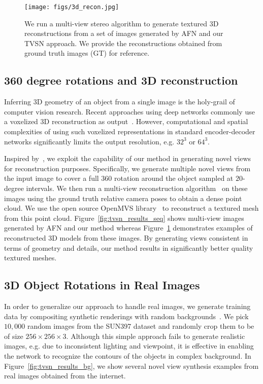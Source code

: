 \documentclass[10pt,twocolumn,letterpaper]{article}
\begin{document}
\begin{figure}[t]
\vspace{-2mm}
\begin{center}
\texttt{[image: figs/3d\_recon.jpg]}
\end{center}
\caption{We run a multi-view stereo algorithm to generate textured 3D reconstructions from a set of images generated by AFN and our TVSN approach. We provide the reconstructions obtained from ground truth images (GT) for reference.}
\label{fig:3d_reconstruction}
\vspace{-2mm}
\vspace{-2mm}
\end{figure}

\subsection{360 degree rotations and 3D reconstruction}

Inferring 3D geometry of an object from a single image is the holy-grail of computer vision research. Recent approaches using deep networks commonly use a voxelized 3D reconstruction as output~\cite{choy_eccv2016,we_nips2016}. However, computational and spatial complexities of using such voxelized representations in standard encoder-decoder networks significantly limits the output resolution, e.g. $32^3$ or $64^3$. %

Inspired by~\cite{tatarchenko_eccv2016}, we exploit the capability of our method in generating novel views for reconstruction purposes. Specifically, we generate multiple novel views from the input image to cover a full 360 rotation around the object sampled at $20$-degree intervals. We then run a multi-view reconstruction algorithm~\cite{furukawa_mvs} on these images using the ground truth relative camera poses to obtain a dense point cloud. We use the open source OpenMVS library~\cite{openMVS} to reconstruct a textured mesh from this point cloud. Figure~\ref{fig:tvsn_results_seq} shows multi-view images generated by AFN and our method whereas Figure~\ref{fig:3d_reconstruction} demonstrates examples of reconstructed 3D models from these images. By generating views consistent in terms of geometry and details, our method results in significantly better quality textured meshes.

\subsection{3D Object Rotations in Real Images}
In order to generalize our approach to handle real images, we generate training data by compositing synthetic renderings with random backgrounds~\cite{Su_iccv2015}. We pick $10,000$ random images from the SUN397 dataset\cite{Su_iccv2015} and randomly crop them to be of size $256\!\times\!256\!\times\!3$. Although this simple approach fails to generate realistic images, e.g. due to inconsistent lighting and viewpoint, it is effective in enabling the network to recognize the contours of the objects in complex background. In Figure~\ref{fig:tvsn_results_bg}, we show several novel view synthesis examples from real images obtained from the internet. 
\end{document}
